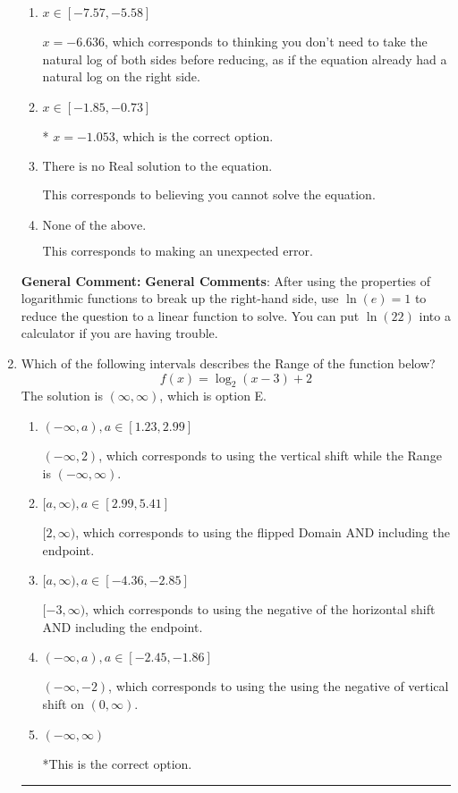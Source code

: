 \documentclass{extbook}[14pt]
\newcommand{\litem}[1]{\item #1

\rule{\textwidth}{0.4pt}}
\begin{document}
\begin{enumerate}
{\begin{enumerate}[label=\Alph*.]
$x = -0.189$, which corresponds to treating any root as a square root.
\item \( x \in [-7.57, -5.58] \)

$x = -6.636$, which corresponds to thinking you don't need to take the natural log of both sides before reducing, as if the equation already had a natural log on the right side.
\item \( x \in [-1.85, -0.73] \)

* $x = -1.053$, which is the correct option.
\item \( \text{There is no Real solution to the equation.} \)

This corresponds to believing you cannot solve the equation.
\item \( \text{None of the above.} \)

This corresponds to making an unexpected error.
\end{enumerate}

\textbf{General Comment:} \textbf{General Comments}: After using the properties of logarithmic functions to break up the right-hand side, use $\ln(e) = 1$ to reduce the question to a linear function to solve. You can put $\ln(22)$ into a calculator if you are having trouble.
}
\litem{
Which of the following intervals describes the Range of the function below?
\[ f(x) = \log_2{(x-3)}+2 \]The solution is \( (\infty, \infty) \), which is option E.\begin{enumerate}[label=\Alph*.]
\item \( (-\infty, a), a \in [1.23, 2.99] \)

$(-\infty, 2)$, which corresponds to using the vertical shift while the Range is $(-\infty, \infty)$.
\item \( [a, \infty), a \in [2.99, 5.41] \)

$[2, \infty)$, which corresponds to using the flipped Domain AND including the endpoint.
\item \( [a, \infty), a \in [-4.36, -2.85] \)

$[-3, \infty)$, which corresponds to using the negative of the horizontal shift AND including the endpoint.
\item \( (-\infty, a), a \in [-2.45, -1.86] \)

$(-\infty, -2)$, which corresponds to using the using the negative of vertical shift on $(0, \infty)$.
\item \( (-\infty, \infty) \)

*This is the correct option.
\end{enumerate}

}
\end{enumerate}
\end{document}
